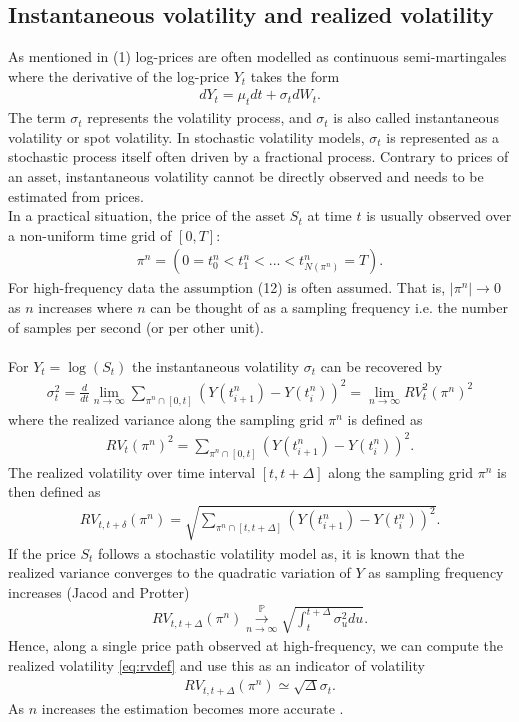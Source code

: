 \documentclass{article}
\begin{document}
\subsection{Instantaneous volatility and realized volatility}
As mentioned in (1) log-prices are often modelled as continuous semi-martingales where the derivative of the log-price $Y_t$ takes the form
\begin{align*}
dY_t = \mu_tdt+\sigma_tdW_t.
\end{align*}
The term $\sigma_t$ represents the volatility process, and $\sigma_t$ is also called instantaneous volatility or spot volatility. In stochastic volatility models, $\sigma_t$ is represented as a stochastic process itself often driven by a fractional process. Contrary to prices of an asset, instantaneous volatility cannot be directly observed and needs to be estimated from prices.\\
In a practical situation, the price of the asset $S_t$ at time $t$ is usually observed over a non-uniform time grid of $[0,T]$:
\begin{align*}
\pi^n = \left(0=t^n_0<t^n_1<...<t^n_{N(\pi^n)}=T\right).
\end{align*}
For high-frequency data the assumption (12) is often assumed. That is, $\rvert \pi^n\lvert\rightarrow 0$ as $n$ increases where $n$ can be thought of as a sampling frequency i.e. the number of samples per second (or per other unit).\\\\
For $Y_t= \log(S_t)$ the instantaneous volatility $\sigma_t$ can be recovered by 
\begin{align*}
\sigma_t^2 =  \frac{d}{dt} \lim_{n\rightarrow \infty} \sum_{\pi^n \cap [0,t]} \left( Y(t_{i+1}^n)-Y(t_i^n)\right)^2 = \lim_{n\rightarrow \infty} RV_t^2(\pi^n)^2
\end{align*} 
where the realized variance along the sampling grid $\pi^n$ is defined as
\begin{align}
RV_t(\pi^n)^2 = \sum_{\pi^n \cap [0,t]}\left(Y(t_{i+1}^n )-Y(t_i^n)\right)^2. \label{eq:reavardef}
\end{align} 
The realized volatility over time interval $[t,t+\Delta]$ along the sampling grid $\pi^n$ is then defined as 
\begin{align}
RV_{t,t+\delta}(\pi^n) = \sqrt{\sum_{\pi^n \cap [t,t+\Delta]}\left(Y(t_{i+1}^n )-Y(t_i^n)\right)^2}. \label{eq:rvdef}
\end{align}
If the price $S_t$ follows a stochastic volatility model as, it is known that the realized variance converges to the quadratic variation of $Y$ as sampling frequency increases (Jacod and Protter)
\begin{align*}
 RV_{t,t+\Delta} (\pi^n) \overset{\mathbb{P}}{\underset{n \to \infty}{\longrightarrow}} \sqrt{\int^{t+\Delta}_t\sigma^2_u du}.
\end{align*}
Hence, along a single price path observed at high-frequency, we can compute the realized volatility \eqref{eq:rvdef} and use this as an indicator of volatility
\begin{align*}
 RV_{t,t+\Delta} (\pi^n)\simeq \sqrt{\Delta} \sigma_t.
\end{align*}
As $n$ increases the estimation becomes more accurate \cite{cont}.
\end{document}
